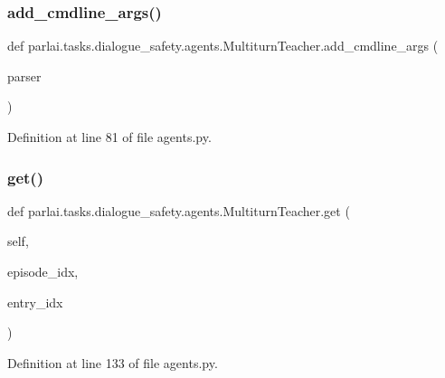 \subsubsection{\texorpdfstring{add\+\_\+cmdline\+\_\+args()}{add\_cmdline\_args()}}
{\footnotesize\ttfamily def parlai.\+tasks.\+dialogue\+\_\+safety.\+agents.\+Multiturn\+Teacher.\+add\+\_\+cmdline\+\_\+args (\begin{DoxyParamCaption}\item[{}]{parser }\end{DoxyParamCaption})\hspace{0.3cm}{\ttfamily [static]}}



Definition at line 81 of file agents.\+py.

\mbox{\label{classparlai_1_1tasks_1_1dialogue__safety_1_1agents_1_1MultiturnTeacher_a75d52a7b90a5566b10803ad5d1c8acf0}} 
\subsubsection{\texorpdfstring{get()}{get()}}
{\footnotesize\ttfamily def parlai.\+tasks.\+dialogue\+\_\+safety.\+agents.\+Multiturn\+Teacher.\+get (\begin{DoxyParamCaption}\item[{}]{self,  }\item[{}]{episode\+\_\+idx,  }\item[{}]{entry\+\_\+idx }\end{DoxyParamCaption})}



Definition at line 133 of file agents.\+py.



